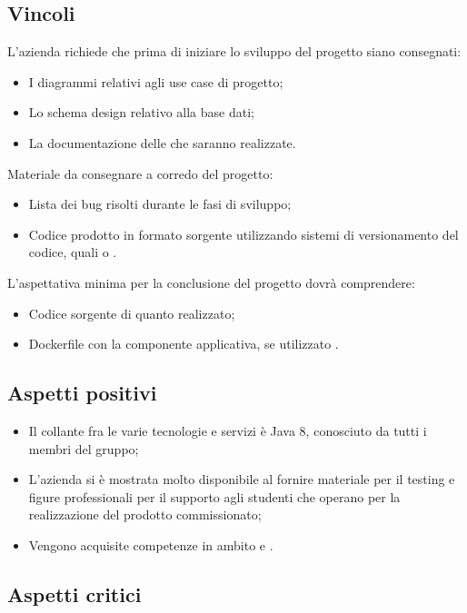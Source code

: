\subsection{Vincoli}
L'azienda richiede che prima di iniziare lo sviluppo del progetto siano consegnati:
\begin{itemize}
\item I diagrammi  relativi agli use case di progetto;
\item Lo schema design relativo alla base dati;
\item La documentazione delle  che saranno realizzate. 
\end{itemize}
Materiale da consegnare a corredo del progetto: 
\begin{itemize}
\item Lista dei bug risolti durante le fasi di sviluppo;
\item Codice prodotto in formato sorgente utilizzando sistemi di versionamento del codice, quali  o .
\end{itemize}
L'aspettativa minima per la conclusione del progetto dovrà comprendere: 
\begin{itemize}
\item Codice sorgente di quanto realizzato;
\item Dockerfile con la componente applicativa, se utilizzato .
\end{itemize}

\subsection{Aspetti positivi}
\begin{itemize}
\item Il collante fra le varie tecnologie e servizi è Java 8, conosciuto da tutti i membri del gruppo;
\item L'azienda si \`e mostrata molto disponibile al fornire materiale per il testing e figure professionali per il supporto agli studenti che operano per la realizzazione del prodotto commissionato;
\item Vengono acquisite competenze in ambito  e .
\end{itemize}

\subsection{Aspetti critici}

